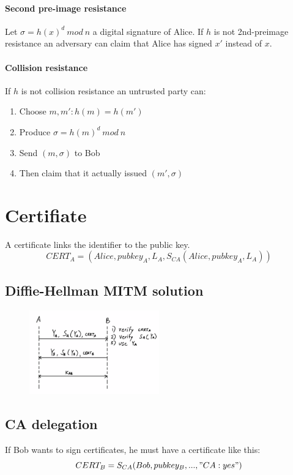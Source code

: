 \documentclass[a4paper,12pt]{article}
\begin{document}
\paragraph{Second pre-image resistance}
Let $\sigma = h(x)^d\ mod\ n$ a digital signature of Alice. If $h$ is not 2nd-preimage resistance an adversary can claim that Alice has signed $x'$ instead of $x$.

\paragraph{Collision resistance}
If $h$ is not collision resistance an untrusted party can:
\begin{enumerate}
	\item Choose $m, m' : h(m) = h(m')$
	\item Produce $\sigma = h(m)^d\ mod\ n$
	\item Send $(m, \sigma)$ to Bob
	\item Then claim that it actually issued $(m', \sigma)$
\end{enumerate}

\section{Certifiate}
A certificate links the identifier to the public key.
$$ CERT_A = (Alice, pubkey_A, L_A, S_{CA}(Alice, pubkey_A, L_A))$$

\subsection{Diffie-Hellman MITM solution}

\begin{figure}[H]
  \centering
  \includegraphics[width=0.5\textwidth]{img/dh-cert}
\end{figure}

\subsection{CA delegation}
If Bob wants to sign certificates, he must have a certificate like this:
$$ CERT_B = S_{CA}(Bob, pubkey_B, ..., "CA:yes")$$
\end{document}
